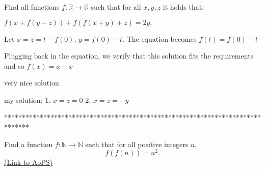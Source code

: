 \begin{solution}
	\begin{tcolorbox}Find all functions $ f: \mathbb{R} \rightarrow \mathbb{R}$ such that for all $ x,y,z$ it holds that:

$ f(x + f(y + z)) + f(f(x + y) + z) = 2y.$\end{tcolorbox}

Let $ x=z=t-f(0)$, $ y=f(0)-t$. The equation becomes $ f(t)=f(0)-t$

Plugging back in the equation, we verify that this solution fits the requirements and so $ \boxed{f(x)=a-x}$
\end{solution}



\begin{solution}
	very nice solution  
\end{solution}



\begin{solution}
	my solution:
1. $ x=z=0$
2. $ x=z=-y$
\end{solution}
*******************************************************************************
-------------------------------------------------------------------------------

\begin{problem}
	Find a function $f: \mathbb N \to \mathbb N$ such that for all positive integers $n$, \[ f(f(n))=n^2.\]
	\flushright \href{https://artofproblemsolving.com/community/c6h289799}{(Link to AoPS)}
\end{problem}



